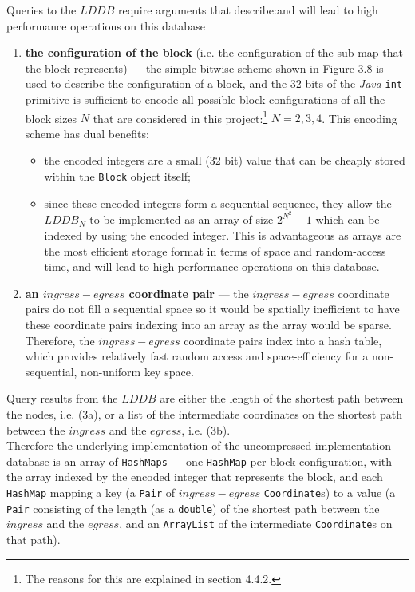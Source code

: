\documentclass[12pt,notitlepage]{report}
\begin{document}
\noindent
Queries to the $LDDB$ require arguments that describe:and will lead to high performance operations on this database
\begin{enumerate} 
\item{\bfseries the configuration of the block} (i.e. the configuration of the sub-map that the block represents) ---  the simple bitwise scheme shown in Figure 3.8 is used to describe the configuration of a block, and the 32 bits of the {\em Java} {\tt int} primitive is sufficient to encode all possible block configurations of all the block sizes $N$ that are considered in this project:\footnote{The reasons for this are explained in section 4.4.2.} $N=2, 3, 4$. This encoding scheme has dual benefits:
\begin{itemize}
\item the encoded integers are a small (32 bit) value that can be cheaply stored within the {\tt Block} object itself;
\item since these encoded integers form a sequential sequence, they allow the $LDDB_{N}$ to be implemented as an array of size $2^{N^{2}}-1$ which can be indexed by using the encoded integer. This is advantageous as arrays are the most efficient storage format in terms of space and random-access time, and will lead to high performance operations on this database.
\end{itemize}


\item{\bfseries an $ingress-egress$ coordinate pair} --- the $ingress-egress$ coordinate pairs do not fill a sequential space so it would be spatially inefficient to have these coordinate pairs indexing into an array as the array would be sparse. Therefore, the $ingress-egress$ coordinate pairs index into a hash table, which provides relatively fast random access and space-efficiency for a non-sequential, non-uniform key space.\\

\end{enumerate}

\noindent
Query results from the $LDDB$ are either the length of the shortest path between the nodes, i.e. (3a), or a list of the intermediate coordinates on the shortest path between the $ingress$ and the $egress$, i.e. (3b).\\

\noindent
Therefore the underlying implementation of the uncompressed implementation database is an array of {\tt  HashMaps} --- one {\tt HashMap} per block configuration, with the array indexed by the encoded integer that represents the block, and each {\tt HashMap} mapping a key (a {\tt Pair} of $ingress-egress$ {\tt Coordinate}s) to a value (a {\tt Pair} consisting of the length (as a {\tt double}) of the shortest path between the $ingress$ and the $egress$, and an {\tt ArrayList} of the intermediate {\tt Coordinate}s on that path).\\
\end{document}

